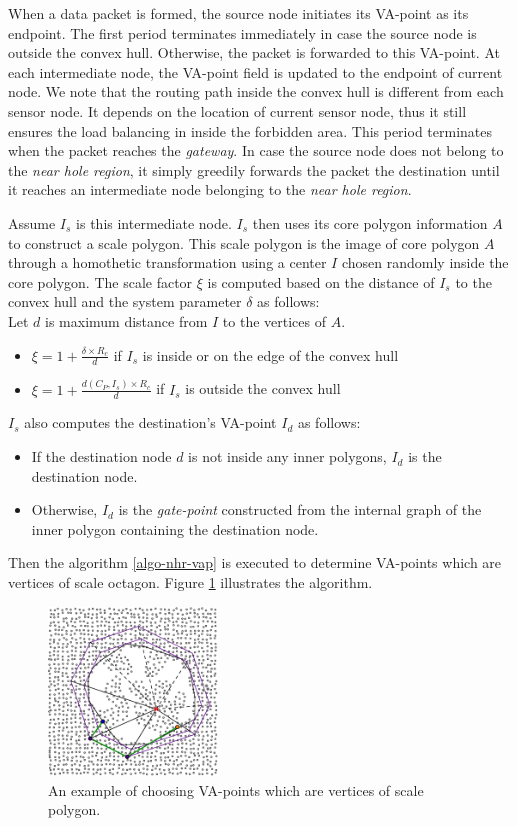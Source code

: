 When a data packet is formed, the source node initiates its VA-point as its endpoint. The first period terminates immediately in case the source node is outside the convex hull. Otherwise, the packet is forwarded to this VA-point. At each intermediate node, the VA-point field is updated to the endpoint of current node. We note that the routing path inside the convex hull is different from each sensor node. It depends on the location of current sensor node, thus it still ensures the load balancing in inside the forbidden area. This period terminates when the packet reaches the \emph{gateway}. In case the source node does not belong to the \emph{near hole region}, it simply greedily forwards the packet the destination until it reaches an intermediate node belonging to the \emph{near hole region}.

Assume $I_s$ is this intermediate node. $I_s$ then uses its core polygon information $A$ to construct a scale polygon. This scale polygon is the image of core polygon $A$ through a homothetic transformation using a center $I$ chosen randomly inside the core polygon. The scale factor $\xi$ is computed based on the distance of $I_s$ to the convex hull and the system parameter $\delta$ as follows:\\
Let $d$ is maximum distance from $I$ to the vertices of $A$.
\begin{itemize}
\item $\xi = 1 + \frac{\delta \times R_c}{d}$ if $I_s$ is inside or on the edge of the convex hull
\item $\xi = 1 + \frac{d(C_P, I_s) \times R_c}{d}$ if $I_s$ is outside the convex hull 
\end{itemize}
$I_s$ also computes the destination's VA-point $I_d$ as follows:
\begin{itemize}
\item If the destination node $d$ is not inside any inner polygons, $I_d$ is the destination node.
\item Otherwise, $I_d$ is the \emph{gate-point} constructed from the internal graph of the inner polygon containing the destination node.
\end{itemize}

Then the algorithm \ref{algo-nhr-vap} is executed to determine VA-points which are vertices of scale octagon. Figure \ref{fig-nhr-vap} illustrates the algorithm.

\begin{figure}[!htb]
\centering
\includegraphics[width=0.4\textwidth]{Chapter4/Chapter4Figs/fig-octagon-vap.eps}
\caption{An example of choosing VA-points which are vertices of scale polygon.}
\label{fig-nhr-vap}
\end{figure}


